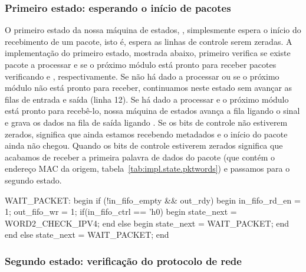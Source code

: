 
\subsubsection*{Primeiro estado: esperando o início de pacotes}

O primeiro estado da nossa máquina de estados, ,
simplesmente espera o início do recebimento de um pacote, isto é, espera
as linhas de controle serem zeradas.  A implementação do primeiro
estado, mostrada abaixo, primeiro verifica se existe pacote a processar
e se o próximo módulo está pronto para receber pacotes verificando
 e , respectivamente.  Se não há dado
a processar ou se o próximo módulo não está pronto para receber,
continuamos neste estado sem avançar as filas de entrada e saída (linha
12).  Se há dado a processar e o próximo módulo está pronto para
recebê-lo, nossa máquina de estados avança a fila ligando o sinal
 e grava os dados na fila de saída ligando
.  Se os bits de controle  não
estiverem zerados, significa que ainda estamos recebendo metadados e o
início do pacote ainda não chegou.  Quando os bits de controle estiverem
zerados significa que acabamos de receber a primeira palavra de dados do
pacote (que contém o endereço MAC da origem,
tabela~\ref{tab:impl.state.pktwords}) e passamos para o segundo estado.

\begin{verilogcode}
  WAIT_PACKET: begin
     if (!in_fifo_empty && out_rdy) begin
        in_fifo_rd_en = 1;
        out_fifo_wr = 1;
        if(in_fifo_ctrl == 'h0) begin
           state_next = WORD2_CHECK_IPV4;
        end else begin
           state_next = WAIT_PACKET;
        end
     end
     else
        state_next = WAIT_PACKET;
  end
\end{verilogcode}


\subsubsection*{Segundo estado: verificação do protocolo de rede}

